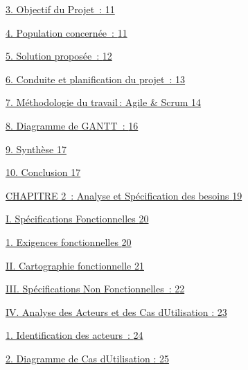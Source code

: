 \documentclass[12pt,a4paper,twoside]{report}
\begin{document}
\protect\hyperlink{objectif-du-projet}{3. Objectif du Projet~:
\protect\hyperlink{objectif-du-projet}{11}}

\protect\hyperlink{population-concernuxe9e}{4. Population concernée~:
\protect\hyperlink{population-concernuxe9e}{11}}

\protect\hyperlink{solution-proposuxe9e}{5. Solution proposée~:
\protect\hyperlink{solution-proposuxe9e}{12}}

\protect\hyperlink{conduite-et-planification-du-projet}{6. Conduite et
planification du projet~:
\protect\hyperlink{conduite-et-planification-du-projet}{13}}

\protect\hyperlink{muxe9thodologie-du-travail-agile-scrum}{7.
Méthodologie du travail\,: Agile \& Scrum
\protect\hyperlink{muxe9thodologie-du-travail-agile-scrum}{14}}

\protect\hyperlink{diagramme-de-gantt}{8. Diagramme de GANTT~:
\protect\hyperlink{diagramme-de-gantt}{16}}

\protect\hyperlink{synthuxe8se}{9. Synthèse
\protect\hyperlink{synthuxe8se}{17}}

\protect\hyperlink{conclusion}{10. Conclusion
\protect\hyperlink{conclusion}{17}}

\protect\hyperlink{section-2}{CHAPITRE 2~: Analyse et Spécification des
besoins \protect\hyperlink{section-2}{19}}

\protect\hyperlink{spuxe9cifications-fonctionnelles}{I. Spécifications
Fonctionnelles \protect\hyperlink{spuxe9cifications-fonctionnelles}{20}}

\protect\hyperlink{exigences-fonctionnelles}{1. Exigences fonctionnelles
\protect\hyperlink{exigences-fonctionnelles}{20}}

\protect\hyperlink{cartographie-fonctionnelle}{II. Cartographie
fonctionnelle \protect\hyperlink{cartographie-fonctionnelle}{21}}

\protect\hyperlink{spuxe9cifications-non-fonctionnelles}{III.
Spécifications Non Fonctionnelles~:
\protect\hyperlink{spuxe9cifications-non-fonctionnelles}{22}}

\protect\hyperlink{analyse-des-acteurs-et-des-cas-dutilisation}{IV.
Analyse des Acteurs et des Cas d\textquotesingle Utilisation :
\protect\hyperlink{analyse-des-acteurs-et-des-cas-dutilisation}{23}}

\protect\hyperlink{identification-des-acteurs}{1. Identification des
acteurs~: \protect\hyperlink{identification-des-acteurs}{24}}

\protect\hyperlink{diagramme-de-cas-dutilisation}{2. Diagramme de Cas
d\textquotesingle Utilisation :
\protect\hyperlink{diagramme-de-cas-dutilisation}{25}}
\end{document}
